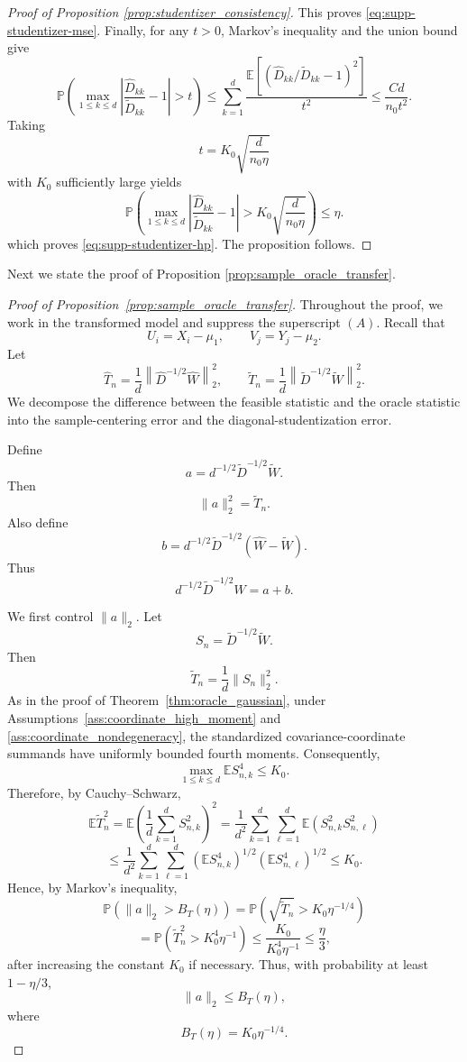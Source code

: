 \documentclass[
  12pt]{article}
\theoremstyle{plain}
\theoremstyle{definition}
\theoremstyle{remark}
\begin{document}
\begin{proof}[Proof of Proposition \ref{prop:studentizer_consistency}]
This proves \eqref{eq:supp-studentizer-mse}.  Finally, for any \(t>0\),
Markov's inequality and the union bound give
\[
\mathbb P
\left(
\max_{1\le k\le d}
\left|
\frac{\widehat D_{kk}}{\widetilde D_{kk}}-1
\right|
>t
\right)
\le
\sum_{k=1}^d
\frac{
\mathbb E
\left[
\left(
\widehat D_{kk}/\widetilde D_{kk}-1
\right)^2
\right]
}{t^2}
\le
\frac{Cd}{n_0t^2}.
\]
Taking
\[
t=K_0\sqrt{\frac{d}{n_0\eta}}
\]
with \(K_0\) sufficiently large yields
\[
\mathbb P
\left(
\max_{1\le k\le d}
\left|
\frac{\widehat D_{kk}}{\widetilde D_{kk}}-1
\right|
>
K_0\sqrt{\frac{d}{n_0\eta}}
\right)
\le \eta.
\]
which proves \eqref{eq:supp-studentizer-hp}.  The proposition follows.
\end{proof}

Next we state the proof of Proposition \ref{prop:sample_oracle_transfer}.
\begin{proof}[Proof of Proposition~\ref{prop:sample_oracle_transfer}]
Throughout the proof, we work in the transformed model and suppress the
superscript \((A)\). Recall that
\[
U_i=X_i-\mu_1,
\qquad
V_j=Y_j-\mu_2.
\]
Let
\[
\widehat T_n
=
\frac1d
\left\|
\widehat D^{-1/2}\widehat W
\right\|_2^2,
\qquad
\widetilde T_n
=
\frac1d
\left\|
\widetilde D^{-1/2}\widetilde W
\right\|_2^2.
\]
We decompose the difference between the feasible statistic and the oracle
statistic into the sample-centering error and the diagonal-studentization error.

Define
\[
a
=
d^{-1/2}\widetilde D^{-1/2}\widetilde W.
\]
Then
\[
\|a\|_2^2
=
\widetilde T_n.
\]
Also define
\[
b
=
d^{-1/2}
\widetilde D^{-1/2}
(\widehat W-\widetilde W).
\]
Thus
\[
d^{-1/2}\widetilde D^{-1/2}\widehat W
=
a+b.
\]

We first control \(\|a\|_2\). Let
\[
S_n=\widetilde D^{-1/2}\widetilde W.
\]
Then
\[
\widetilde T_n=\frac1d\|S_n\|_2^2.
\]
As in the proof of Theorem~\ref{thm:oracle_gaussian}, under
Assumptions~\ref{ass:coordinate_high_moment} and
\ref{ass:coordinate_nondegeneracy}, the standardized covariance-coordinate
summands have uniformly bounded fourth moments. Consequently,
\[
\max_{1\le k\le d}\mathbb E S_{n,k}^4\le K_0.
\]
Therefore, by Cauchy--Schwarz,
\[
\mathbb E\widetilde T_n^2
=
\mathbb E
\left(
\frac1d\sum_{k=1}^d S_{n,k}^2
\right)^2
=
\frac1{d^2}
\sum_{k=1}^d\sum_{\ell=1}^d
\mathbb E(S_{n,k}^2S_{n,\ell}^2)
\]
\[
\le
\frac1{d^2}
\sum_{k=1}^d\sum_{\ell=1}^d
\left(\mathbb E S_{n,k}^4\right)^{1/2}
\left(\mathbb E S_{n,\ell}^4\right)^{1/2}
\le K_0.
\]
Hence, by Markov's inequality,
\[
\mathbb P
\left(
\|a\|_2>B_T(\eta)
\right)
=
\mathbb P
\left(
\sqrt{\widetilde T_n}>K_0\eta^{-1/4}
\right)
\]
\[
=
\mathbb P
\left(
\widetilde T_n^2>K_0^4\eta^{-1}
\right)
\le
\frac{K_0}{K_0^4\eta^{-1}}
\le
\frac{\eta}{3},
\]
after increasing the constant \(K_0\) if necessary. Thus, with probability at
least \(1-\eta/3\),
\[
\|a\|_2\le B_T(\eta),
\]
where
\[
B_T(\eta)=K_0\eta^{-1/4}.
\]


\end{proof}
\end{document}
